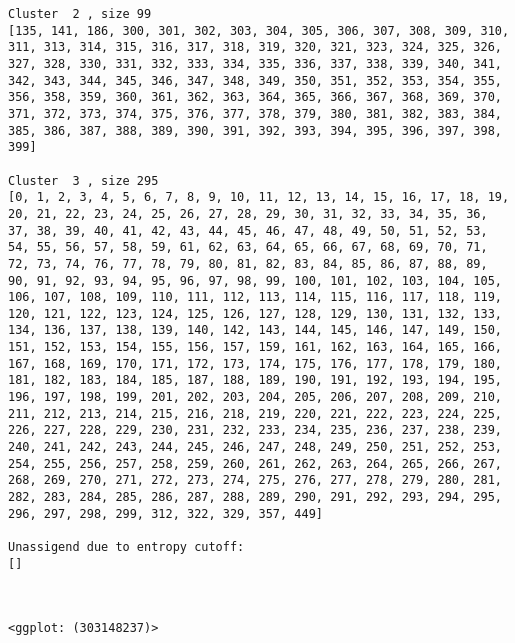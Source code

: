 \documentclass{article}
\begin{document}
\begin{Verbatim}[commandchars=\\\{\}]
Cluster  2 , size 99
[135, 141, 186, 300, 301, 302, 303, 304, 305, 306, 307, 308, 309, 310, 311, 313, 314, 315, 316, 317, 318, 319, 320, 321, 323, 324, 325, 326, 327, 328, 330, 331, 332, 333, 334, 335, 336, 337, 338, 339, 340, 341, 342, 343, 344, 345, 346, 347, 348, 349, 350, 351, 352, 353, 354, 355, 356, 358, 359, 360, 361, 362, 363, 364, 365, 366, 367, 368, 369, 370, 371, 372, 373, 374, 375, 376, 377, 378, 379, 380, 381, 382, 383, 384, 385, 386, 387, 388, 389, 390, 391, 392, 393, 394, 395, 396, 397, 398, 399] 

Cluster  3 , size 295
[0, 1, 2, 3, 4, 5, 6, 7, 8, 9, 10, 11, 12, 13, 14, 15, 16, 17, 18, 19, 20, 21, 22, 23, 24, 25, 26, 27, 28, 29, 30, 31, 32, 33, 34, 35, 36, 37, 38, 39, 40, 41, 42, 43, 44, 45, 46, 47, 48, 49, 50, 51, 52, 53, 54, 55, 56, 57, 58, 59, 61, 62, 63, 64, 65, 66, 67, 68, 69, 70, 71, 72, 73, 74, 76, 77, 78, 79, 80, 81, 82, 83, 84, 85, 86, 87, 88, 89, 90, 91, 92, 93, 94, 95, 96, 97, 98, 99, 100, 101, 102, 103, 104, 105, 106, 107, 108, 109, 110, 111, 112, 113, 114, 115, 116, 117, 118, 119, 120, 121, 122, 123, 124, 125, 126, 127, 128, 129, 130, 131, 132, 133, 134, 136, 137, 138, 139, 140, 142, 143, 144, 145, 146, 147, 149, 150, 151, 152, 153, 154, 155, 156, 157, 159, 161, 162, 163, 164, 165, 166, 167, 168, 169, 170, 171, 172, 173, 174, 175, 176, 177, 178, 179, 180, 181, 182, 183, 184, 185, 187, 188, 189, 190, 191, 192, 193, 194, 195, 196, 197, 198, 199, 201, 202, 203, 204, 205, 206, 207, 208, 209, 210, 211, 212, 213, 214, 215, 216, 218, 219, 220, 221, 222, 223, 224, 225, 226, 227, 228, 229, 230, 231, 232, 233, 234, 235, 236, 237, 238, 239, 240, 241, 242, 243, 244, 245, 246, 247, 248, 249, 250, 251, 252, 253, 254, 255, 256, 257, 258, 259, 260, 261, 262, 263, 264, 265, 266, 267, 268, 269, 270, 271, 272, 273, 274, 275, 276, 277, 278, 279, 280, 281, 282, 283, 284, 285, 286, 287, 288, 289, 290, 291, 292, 293, 294, 295, 296, 297, 298, 299, 312, 322, 329, 357, 449] 

Unassigend due to entropy cutoff:
[]
    \end{Verbatim}

    \begin{center}
    \end{center}
    { \hspace*{\fill} \\}
    
    \begin{Verbatim}[commandchars=\\\{\}]
<ggplot: (303148237)>
    \end{Verbatim}
\end{document}
